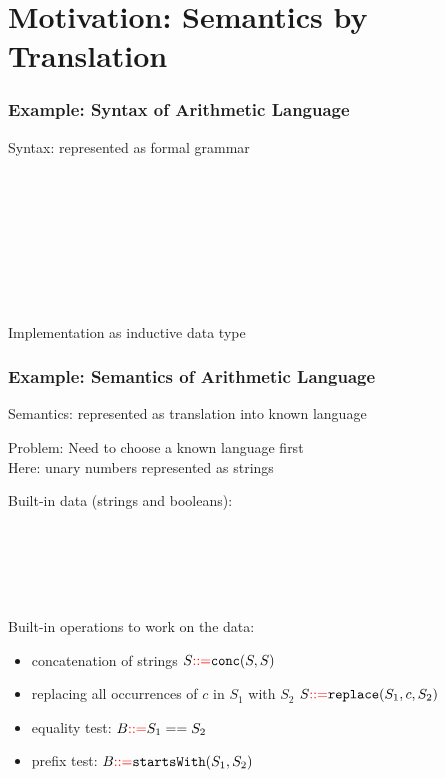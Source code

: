 \section{Motivation: Semantics by Translation}

\begin{frame}\frametitle{Example: Syntax of Arithmetic Language}
Syntax: represented as formal grammar

\begin{commgrammar}
\\
\\
\\
\\
\\
\\
\\
\end{commgrammar}

Implementation as inductive data type
\end{frame}


\begin{frame}\frametitle{Example: Semantics of Arithmetic Language}
Semantics: represented as translation into known language
\medskip

Problem: Need to choose a known language first\\
Here: unary numbers represented as strings

Built-in data (strings and booleans):
\begin{commgrammar}
\\
\\
\\
\\
\end{commgrammar}

Built-in operations to work on the data:
\begin{itemize}
\item concatenation of strings $S\bbc \cn{conc}(S,S)$
\item replacing all occurrences of $c$ in $S_1$ with $S_2$ $S\bbc \cn{replace}(S_1,c,S_2)$
\item equality test: $B{\color{red}::=} S_1==S_2$
\item prefix test: $B\bbc \cn{startsWith}(S_1,S_2)$
\end{itemize}
\end{frame}

